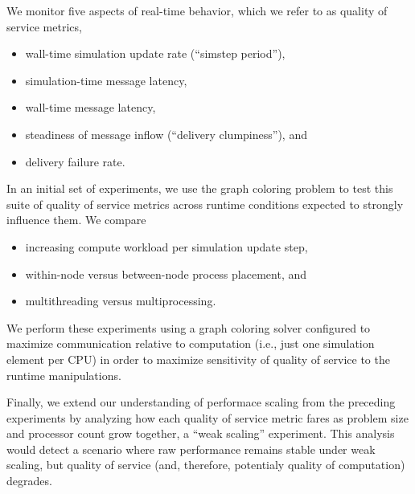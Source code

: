 We monitor five aspects of real-time behavior, which we refer to as quality of service metrics,
\begin{itemize}
  \item wall-time simulation update rate (``simstep period''),
  \item simulation-time message latency,
  \item wall-time message latency,
  \item steadiness of message inflow (``delivery clumpiness''), and
  \item delivery failure rate.
\end{itemize}

In an initial set of experiments, we use the graph coloring problem to test this suite of quality of service metrics across runtime conditions expected to strongly influence them.
We compare
\begin{itemize}
  \item increasing compute workload per simulation update step,
  \item within-node versus between-node process placement, and
  \item multithreading versus multiprocessing.
\end{itemize}
We perform these experiments using a graph coloring solver configured to maximize communication relative to computation (i.e., just one simulation element per CPU) in order to maximize sensitivity of quality of service to the runtime manipulations.

Finally, we extend our understanding of performace scaling from the preceding experiments by analyzing how each quality of service metric fares as problem size and processor count grow together, a ``weak scaling'' experiment.
This analysis would detect a scenario where raw performance remains stable under weak scaling, but quality of service (and, therefore, potentialy quality of computation) degrades.
